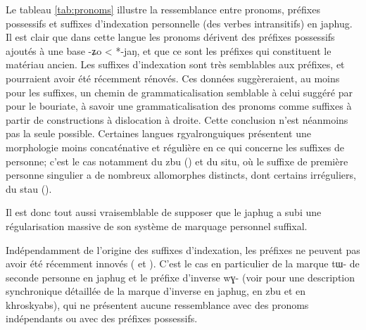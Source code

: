 \documentclass[oldfontcommands,oneside,a4paper,11pt]{article}
\newcommand{\ipa}[1]{{\phon \mbox{#1}}} %
\begin{document}
Le tableau \ref{tab:pronoms} illustre la ressemblance entre pronoms, préfixes possessifs et suffixes d'indexation personnelle (des verbes intransitifs) en japhug. Il est clair que dans cette langue les pronoms dérivent des préfixes possessifs ajoutés à une base \ipa{-ʑo} < *\ipa{-jaŋ}, et que ce sont les préfixes qui constituent le matériau ancien. Les suffixes d'indexation sont très semblables aux préfixes, et pourraient avoir été récemment rénovés. Ces données suggèreraient, au moins pour les suffixes, un chemin de grammaticalisation semblable à celui  suggéré par \citet{comrie80morpho} pour le bouriate, à savoir une grammaticalisation des pronoms comme suffixes à partir de constructions à dislocation à droite. Cette conclusion n'est néanmoins pas la seule possible. Certaines langues rgyalronguiques présentent une morphologie moins concaténative et régulière en ce qui concerne les suffixes de personne; c'est le cas notamment du zbu (\citealt{gongxun14agreement}) et du situ, où le suffixe de première personne singulier a de nombreux allomorphes distincts, dont certains irréguliers, du stau (\citealt{jacques14rtau}). 

Il est donc tout aussi vraisemblable de supposer que le japhug a subi une régularisation massive de son système de marquage personnel suffixal.
   
   Indépendamment de l'origine des suffixes d'indexation,  les préfixes ne peuvent pas avoir été récemment innovés (\citealt{jacques12agreement} et \citealt{delancey14second}). C'est le cas en particulier de la marque \ipa{tɯ-} de seconde personne en japhug et le préfixe d'inverse \ipa{wɣ-} (voir \citealt{jacques10inverse, gongxun14agreement, lai15person} pour une description synchronique détaillée de la marque d'inverse en japhug, en zbu et en khroskyabs), qui ne présentent aucune ressemblance avec des pronoms indépendants ou avec des préfixes possessifs.
   
\end{document}
